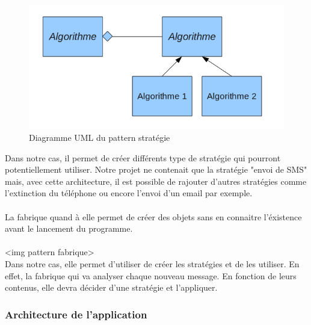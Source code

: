 \begin{figure}[!h]
	\center
	\includegraphics[width=12cm]{img/pattern-strategie.png}
	\caption{Diagramme UML du pattern stratégie}
\end{figure}

Dans notre cas, il permet de créer différents type de stratégie qui pourront potentiellement utiliser. 
Notre projet ne contenait que la stratégie "envoi de SMS" mais, avec cette architecture, il est possible 
de rajouter d'autres stratégies comme l'extinction du téléphone ou encore l'envoi d'un email par exemple.
\\

\paragraph{}
La fabrique quand à elle permet de créer des objets sans en connaitre l'éxistence avant le lancement du 
programme.
\\\\
<img pattern fabrique>
\\
Dans notre cas, elle permet d'utiliser de créer les stratégies et de les utiliser. En effet, la fabrique 
qui va analyser chaque nouveau message. En fonction de leurs contenus, elle devra décider d'une stratégie
et l'appliquer.


\subsubsection{Architecture de l'application}

